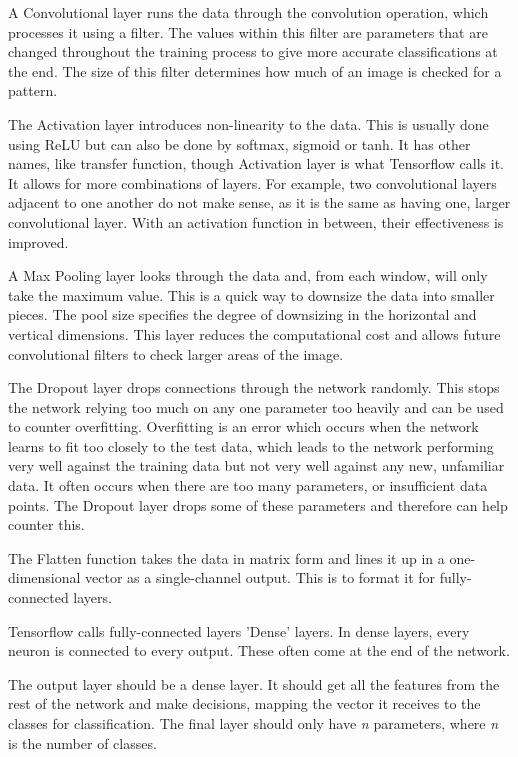 \documentclass[a4paper, 11pt]{article}
\begin{document}
A Convolutional layer runs the data through the convolution operation, which processes it using a filter. The values within this filter are parameters that are changed throughout the training process to give more accurate classifications at the end. The size of this filter determines how much of an image is checked for a pattern.

The Activation layer introduces non-linearity to the data. This is usually done using ReLU but can also be done by softmax, sigmoid or tanh. It has other names, like transfer function, though Activation layer is what Tensorflow calls it. It allows for more combinations of layers. For example, two convolutional layers adjacent to one another do not make sense, as it is the same as having one, larger convolutional layer. With an activation function in between, their effectiveness is improved.

A Max Pooling layer looks through the data and, from each window, will only take the maximum value. This is a quick way to downsize the data into smaller pieces. The pool size specifies the degree of downsizing in the horizontal and vertical dimensions. This layer reduces the computational cost and allows future convolutional filters to check larger areas of the image.

The Dropout layer drops connections through the network randomly. This stops the network relying too much on any one parameter too heavily and can be used to counter overfitting. Overfitting is an error which occurs when the network learns to fit too closely to the test data, which leads to the network performing very well against the training data but not very well against any new, unfamiliar data. It often occurs when there are too many parameters, or insufficient data points. The Dropout layer drops some of these parameters and therefore can help counter this.

The Flatten function takes the data in matrix form and lines it up in a one-dimensional vector as a single-channel output. This is to format it for fully-connected layers.

Tensorflow calls fully-connected layers 'Dense' layers\cite{Dense}. In dense layers, every neuron is connected to every output. These often come at the end of the network. 

The output layer should be a dense layer. It should get all the features from the rest of the network and make decisions, mapping the vector it receives to the classes for classification. The final layer should only have \emph{n} parameters, where \emph{n} is the number of classes.
\end{document}
